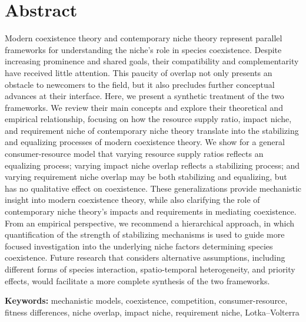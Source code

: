 \section{Abstract}
Modern coexistence theory and contemporary niche theory represent parallel frameworks for understanding the niche's role in species coexistence. Despite increasing prominence and shared goals, their compatibility and complementarity have received little attention. This paucity of overlap not only presents an obstacle to newcomers to the field, but it also precludes further conceptual advances at their interface. Here, we present a synthetic treatment of the two frameworks. We review their main concepts and explore their theoretical and empirical relationship, focusing on how the resource supply ratio, impact niche, and requirement niche of contemporary niche theory translate into the stabilizing and equalizing processes of modern coexistence theory. We show for a general consumer-resource model that varying resource supply ratios reflects an equalizing process; varying impact niche overlap reflects a stabilizing process; and varying requirement niche overlap may be both stabilizing and equalizing, but has no qualitative effect on coexistence. These generalizations provide mechanistic insight into modern coexistence theory, while also clarifying the role of contemporary niche theory's impacts and requirements in mediating coexistence. From an empirical perspective, we recommend a hierarchical approach, in which quantification of the strength of stabilizing mechanisms is used to guide more focused investigation into the underlying niche factors determining species coexistence. Future research that considers alternative assumptions, including different forms of species interaction, spatio-temporal heterogeneity, and priority effects, would facilitate a more complete synthesis of the two frameworks.
\medskip


\textbf{Keywords:} mechanistic models, coexistence, competition, consumer-resource, fitness differences, niche overlap, impact niche, requirement niche, Lotka--Volterra



